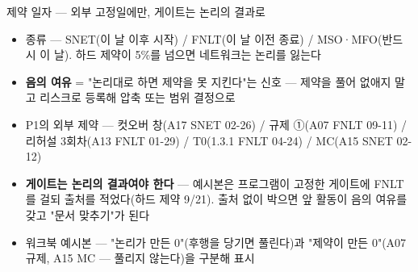 \begin{frame}{제약 일자 — 외부 고정일에만, 게이트는 논리의 결과로}
\begin{itemize}
\item 종류 — SNET(이 날 이후 시작) / FNLT(이 날 이전 종료) / MSO·MFO(반드시 이 날). 하드 제약이 5\%를 넘으면 네트워크는 논리를 잃는다
\item \textbf{음의 여유} = "논리대로 하면 제약을 못 지킨다"는 신호 — 제약을 풀어 없애지 말고 리스크로 등록해 압축 또는 범위 결정으로
\item P1의 외부 제약 — 컷오버 창(A17 SNET 02-26) / 규제 ①(A07 FNLT 09-11) / 리허설 3회차(A13 FNLT 01-29) / T0(1.3.1 FNLT 04-24) / MC(A15 SNET 02-12)
\item \textbf{게이트는 논리의 결과여야 한다} — 예시본은 프로그램이 고정한 게이트에 FNLT를 걸되 출처를 적었다(하드 제약 9/21). 출처 없이 박으면 앞 활동이 음의 여유를 갖고 "문서 맞추기"가 된다
\item 워크북 예시본 — "논리가 만든 0"(후행을 당기면 풀린다)과 "제약이 만든 0"(A07 규제, A15 MC — 풀리지 않는다)을 구분해 표시
\end{itemize}
\end{frame}

